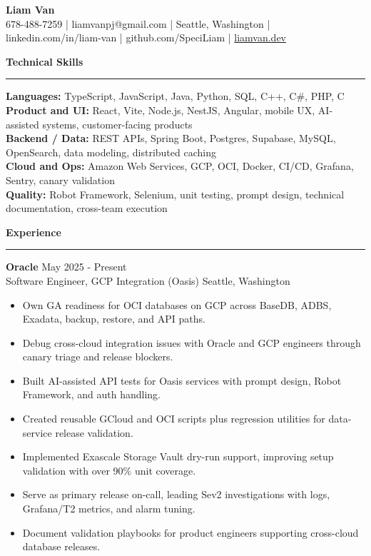 \documentclass[letterpaper,10pt]{article}
\newcommand{\sectiontitle}[1]{\vspace{3pt}\textbf{\large #1}\vspace{1pt}\hrule\vspace{2pt}}
\newcommand{\role}[4]{\textbf{#1} \hfill #2\\#3 \hfill #4\vspace{-2pt}}
\begin{document}
\fontsize{10.4}{11.4}\selectfont

\begin{center}
{\Large \textbf{Liam Van}}\\
678-488-7259 | liamvanpj@gmail.com | Seattle, Washington | linkedin.com/in/liam-van | github.com/SpeciLiam | \href{https://liamvan.dev}{liamvan.dev}
\end{center}

\sectiontitle{Technical Skills}
\textbf{Languages:} TypeScript, JavaScript, Java, Python, SQL, C++, C\#, PHP, C\\
\textbf{Product and UI:} React, Vite, Node.js, NestJS, Angular, mobile UX, AI-assisted systems, customer-facing products\\
\textbf{Backend / Data:} REST APIs, Spring Boot, Postgres, Supabase, MySQL, OpenSearch, data modeling, distributed caching\\
\textbf{Cloud and Ops:} Amazon Web Services, GCP, OCI, Docker, CI/CD, Grafana, Sentry, canary validation\\
\textbf{Quality:} Robot Framework, Selenium, unit testing, prompt design, technical documentation, cross-team execution

\sectiontitle{Experience}
\role{Oracle}{May 2025 - Present}{Software Engineer, GCP Integration (Oasis)}{Seattle, Washington}
\begin{itemize}
  \item Own GA readiness for OCI databases on GCP across BaseDB, ADBS, Exadata, backup, restore, and API paths.
  \item Debug cross-cloud integration issues with Oracle and GCP engineers through canary triage and release blockers.
  \item Built AI-assisted API tests for Oasis services with prompt design, Robot Framework, and auth handling.
  \item Created reusable GCloud and OCI scripts plus regression utilities for data-service release validation.
  \item Implemented Exascale Storage Vault dry-run support, improving setup validation with over 90\% unit coverage.
  \item Serve as primary release on-call, leading Sev2 investigations with logs, Grafana/T2 metrics, and alarm tuning.
  \item Document validation playbooks for product engineers supporting cross-cloud database releases.
\end{itemize}
\end{document}
